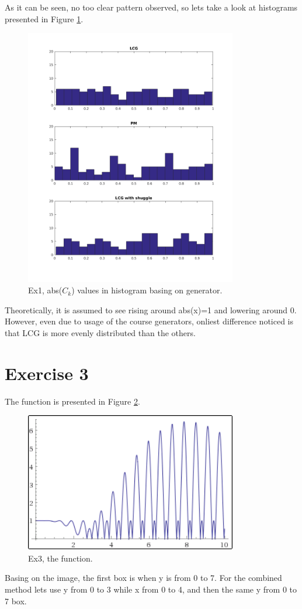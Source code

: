 \documentclass{article}
\begin{document}
As it can be seen, no too clear pattern observed, so lets take a look at histograms presented in Figure \ref{fig:ex2fig3}.


\begin{figure}[!hbt]
	\includegraphics[width=350px]{"../Laskari2/ex2fig3"}
	\caption{Ex1, abs($C_k$) values in histogram basing on generator.}
	\label{fig:ex2fig3}
\end{figure}

Theoretically, it is assumed to see rising around abs(x)=1 and lowering around 0. However, even due to usage of the course generators, onliest difference noticed is that LCG is more evenly distributed than the others.

\section*{Exercise 3}

The function is presented in Figure \ref{fig:ex3function}.
\begin{figure}[!hbt]
	\includegraphics[width=350px]{"../Laskari2/ex3function"}
	\caption{Ex3, the function.}
	\label{fig:ex3function}
\end{figure}
Basing on the image, the first box is when y is from 0 to 7. For the combined method lets use y from 0 to 3 while x from 0 to 4, and then the same y from 0 to 7 box.
\end{document}

